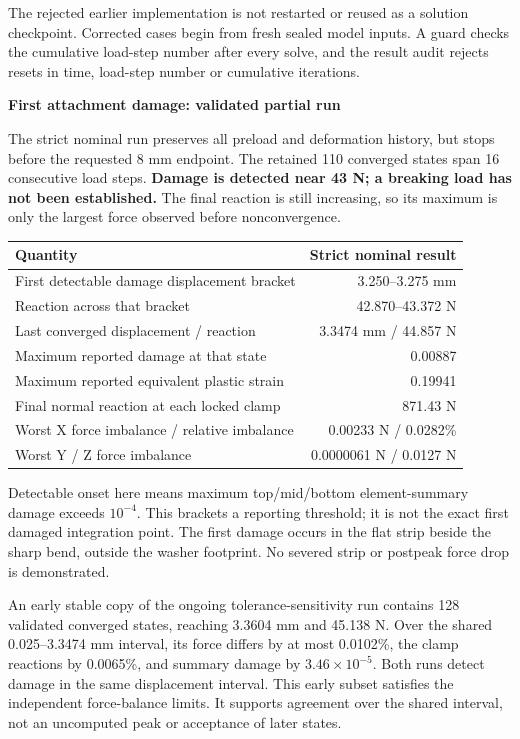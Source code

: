 \documentclass[10pt,a4paper]{article}
\newcommand{\PageTitle}[1]{{\LARGE\bfseries\color{Navy}#1\par}\vspace{7pt}}
\begin{document}
The rejected earlier implementation is not restarted or reused as a solution checkpoint. Corrected cases begin from fresh sealed model inputs. A guard checks the cumulative load-step number after every solve, and the result audit rejects resets in time, load-step number or cumulative iterations.


\clearpage
\PageTitle{First attachment damage: validated partial run}
The strict nominal run preserves all preload and deformation history, but stops before the requested 8 mm endpoint. The retained 110 converged states span 16 consecutive load steps. \textbf{Damage is detected near 43 N; a breaking load has not been established.} The final reaction is still increasing, so its maximum is only the largest force observed before nonconvergence.

\begin{center}
\begin{tabular}{p{.62\linewidth}r}\toprule
Quantity & Strict nominal result\\\midrule
First detectable damage displacement bracket & 3.250--3.275 mm\\
Reaction across that bracket & 42.870--43.372 N\\
Last converged displacement / reaction & 3.3474 mm / 44.857 N\\
Maximum reported damage at that state & 0.00887\\
Maximum reported equivalent plastic strain & 0.19941\\
Final normal reaction at each locked clamp & 871.43 N\\
Worst X force imbalance / relative imbalance & 0.00233 N / 0.0282\%\\
Worst Y / Z force imbalance & 0.0000061 N / 0.0127 N\\\bottomrule
\end{tabular}
\end{center}
Detectable onset here means maximum top/mid/bottom element-summary damage exceeds $10^{-4}$. This brackets a reporting threshold; it is not the exact first damaged integration point. The first damage occurs in the flat strip beside the sharp bend, outside the washer footprint. No severed strip or postpeak force drop is demonstrated.

An early stable copy of the ongoing tolerance-sensitivity run contains 128 validated converged states, reaching 3.3604 mm and 45.138 N. Over the shared 0.025--3.3474 mm interval, its force differs by at most 0.0102\%, the clamp reactions by 0.0065\%, and summary damage by $3.46\times10^{-5}$. Both runs detect damage in the same displacement interval. This early subset satisfies the independent force-balance limits. It supports agreement over the shared interval, not an uncomputed peak or acceptance of later states.
\end{document}
